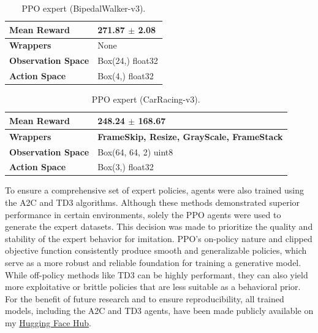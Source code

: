 \begin{table}[H]
\centering
\caption{PPO expert (BipedalWalker-v3).}
\label{tab:ppo_bipedal}
\begin{tabular}{|l|p{7.5cm}|}
\hline
\textbf{Mean Reward}       & 271.87 $\pm$ 2.08 \\ \hline
\textbf{Wrappers}          & None \\ \hline
\textbf{Observation Space} & Box(24,) float32 \\ \hline
\textbf{Action Space}      & Box(4,) float32 \\ \hline
\end{tabular}
\end{table}

\begin{table}[H]
\centering
\caption{PPO expert (CarRacing-v3).}
\label{tab:ppo_carracing}
\begin{tabular}{|l|p{7.5cm}|}
\hline
\textbf{Mean Reward}       & 248.24 $\pm$ 168.67 \\ \hline
\textbf{Wrappers}          & \textbf{FrameSkip, Resize, GrayScale, FrameStack} \\ \hline
\textbf{Observation Space} & Box(64, 64, 2) uint8 \\ \hline
\textbf{Action Space}      & Box(3,) float32 \\ \hline
\end{tabular}
\end{table}

To ensure a comprehensive set of expert policies, agents were also trained using the A2C and TD3 algorithms. Although these methods demonstrated superior performance in certain environments, solely the PPO agents were used to generate the expert datasets. This decision was made to prioritize the quality and stability of the expert behavior for imitation. PPO's on-policy nature and clipped objective function consistently produce smooth and generalizable policies, which serve as a more robust and reliable foundation for training a generative model. While off-policy methods like TD3 can be highly performant, they can also yield more exploitative or brittle policies that are less suitable as a behavioral prior. 
For the benefit of future research and to ensure reproducibility, all trained models, including the A2C and TD3 agents, have been made publicly available on my \href {https://huggingface.co/frankcholula}{Hugging Face Hub}.
